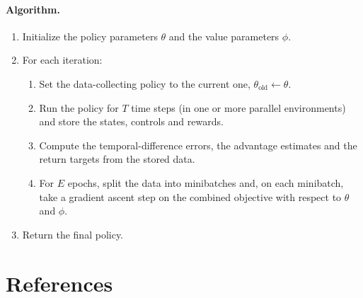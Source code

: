\documentclass[11pt]{article}
\begin{document}
\paragraph{Algorithm.}
\begin{enumerate}[leftmargin=*]
  \item Initialize the policy parameters $\theta$ and the value parameters $\phi$.
  \item For each iteration:
    \begin{enumerate}
      \item Set the data-collecting policy to the current one, $\theta_{\mathrm{old}} \leftarrow \theta$.
      \item Run the policy for $T$ time steps (in one or more parallel environments) and store the
        states, controls and rewards.
      \item Compute the temporal-difference errors, the advantage estimates and the return targets
        from the stored data.
      \item For $E$ epochs, split the data into minibatches and, on each minibatch, take a gradient
        ascent step on the combined objective with respect to $\theta$ and $\phi$.
    \end{enumerate}
  \item Return the final policy.
\end{enumerate}

\section*{References}
\end{document}
